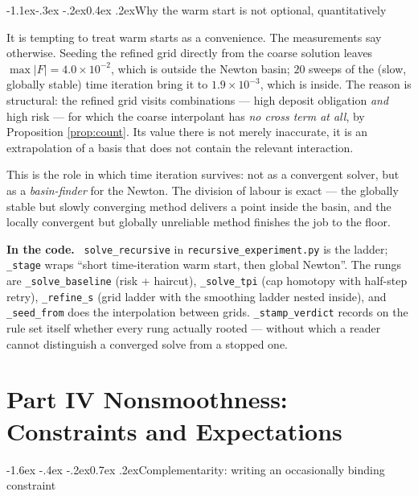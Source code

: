 \documentclass[10pt,a4paper]{article}
\makeatletter
\theoremstyle{definition}
\theoremstyle{plain}
\theoremstyle{remark}
\newenvironment{codehint}%
  {\par\vspace{2pt}\begin{framed}\noindent\small\textcolor{codeblue}{\textbf{In the code.}}\ }%
  {\end{framed}\vspace{2pt}}
\newcommand{\file}[1]{\textcolor{codeblue}{\texttt{#1}}}
\newcommand{\code}[1]{\texttt{#1}}
\renewcommand\section{\@startsection{section}{1}{\z@}%
  {-1.6ex \@plus -.4ex \@minus -.2ex}{0.7ex \@plus.2ex}{\normalfont\large\bfseries}}
\renewcommand\subsection{\@startsection{subsection}{2}{\z@}%
  {-1.1ex\@plus -.3ex \@minus -.2ex}{0.4ex \@plus .2ex}{\normalfont\normalsize\bfseries}}
\makeatother
\begin{document}
\subsection{Why the warm start is not optional, quantitatively}

It is tempting to treat warm starts as a convenience. The measurements say otherwise. Seeding
the refined grid directly from the coarse solution leaves $\max|F| = 4.0\times10^{-2}$, which
is outside the Newton basin; $20$ sweeps of the (slow, globally stable) time iteration bring it
to $1.9\times10^{-3}$, which is inside. The reason is structural: the refined grid visits
combinations --- high deposit obligation \emph{and} high risk --- for which the coarse
interpolant has \emph{no cross term at all}, by Proposition \ref{prop:count}. Its value there
is not merely inaccurate, it is an extrapolation of a basis that does not contain the relevant
interaction.

This is the role in which time iteration survives: not as a convergent solver, but as a
\emph{basin-finder} for the Newton. The division of labour is exact --- the globally stable
but slowly converging method delivers a point inside the basin, and the locally convergent but
globally unreliable method finishes the job to the floor.

\begin{codehint}
\code{solve\_recursive} in \file{recursive\_experiment.py} is the ladder; \code{\_stage}
wraps ``short time-iteration warm start, then global Newton''. The rungs are
\code{\_solve\_baseline} (risk + haircut), \code{\_solve\_tpi} (cap homotopy with half-step
retry), \code{\_refine\_s} (grid ladder with the smoothing ladder nested inside), and
\code{\_seed\_from} does the interpolation between grids. \code{\_stamp\_verdict} records on
the rule set itself whether every rung actually rooted --- without which a reader cannot
distinguish a converged solve from a stopped one.
\end{codehint}

\vspace{-4pt}\part*{Part IV \quad Nonsmoothness: Constraints and Expectations}
\section{Complementarity: writing an occasionally binding constraint}
\label{sec:complementarity}
\end{document}
